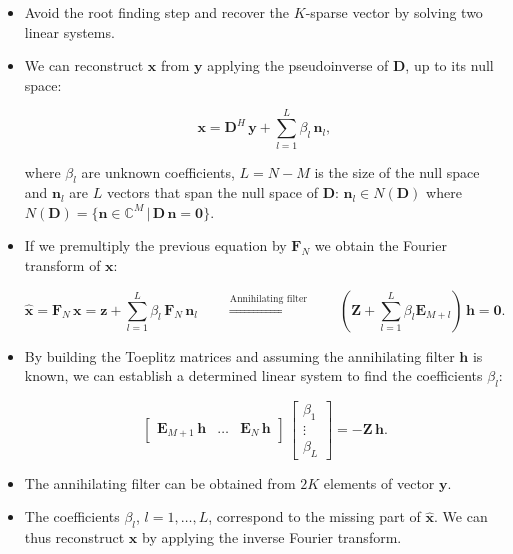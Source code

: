 \documentclass[a0,portrait]{a0poster}
\begin{document}
\begin{multicols}{2}
\begin{itemize}
\item Avoid the root finding step and recover the $K$-sparse vector by solving two linear systems.

\item We can reconstruct $\bm{x}$ from $\bm{y}$ applying the pseudoinverse of $\bm{D}$, up to its null space:

\begin{equation*}
\bm{x} = \bm{D}^H \, \bm{y} + \sum_{l=1}^{L} \beta_l \, \bm{n}_l,
\end{equation*}

\noindent
where $\beta_l$ are unknown coefficients, $L=N-M$ is the size of the null space 
and $\bm{n}_l$ are $L$ vectors that span the 
null space of $\bm{D}$: $\bm{n}_l \in N(\bm{D})$ where 
$N(\bm{D}) = \lbrace \bm{n} \in \mathbb{C}^M \,\vert\, \bm{D} \, \bm{n} = \bm{0} \rbrace$.

\item If we premultiply the previous equation by $\bm{F}_N$ we obtain the 
Fourier transform of $\bm{x}$:

\begin{equation*}
\bm{\hat{x}} 
= \bm{F}_N \, \bm{x} 
= \bm{z} + \sum_{l=1}^{L} \beta_l \, \bm{F}_N \, \bm{n}_l
\qquad 
\overset{\text{Annihilating filter}}{\Longrightarrow}
\qquad
\left( \bm{Z} + \sum_{l=1}^L \beta_l \bm{E}_{M+l} \right) \, \bm{h} = \bm{0}.
\end{equation*}

\item By building the Toeplitz matrices and assuming the annihilating filter $\bm{h}$
is known, we can establish a determined linear system to find the coefficients $\beta_l$:

\begin{equation*}
\begin{bmatrix}
\bm{E}_{M+1} \, \bm{h} & \ldots & \bm{E}_{N} \, \bm{h}
\end{bmatrix}
\,
\begin{bmatrix}
\beta_1\\
\vdots\\
\beta_L
\end{bmatrix}
=
- \bm{Z} \, \bm{h}.
\end{equation*}

\item The annihilating filter can be obtained from $2K$ elements of vector $\bm{y}$.

\item The coefficients $\beta_l$, $l=1,\ldots,L$, correspond to the missing part of $\bm{\hat{x}}$.
We can thus reconstruct $\bm{x}$ by applying the inverse Fourier transform.
\\
\end{itemize}


\end{multicols}
\end{document}
